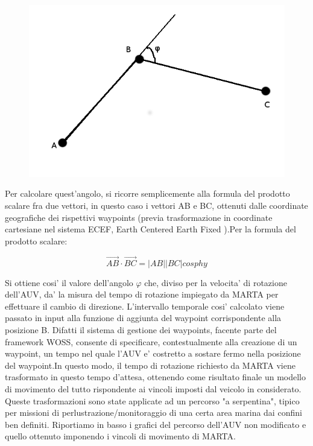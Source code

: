 \begin{figure}[H]
    \centering
	\includegraphics[scale=0.5]{scalarprod.png}
\end{figure}

Per calcolare quest'angolo, si ricorre semplicemente alla formula del prodotto scalare fra due vettori, in questo caso i vettori AB e BC, ottenuti dalle coordinate geografiche dei rispettivi waypoints (previa trasformazione in coordinate cartesiane nel sistema ECEF, Earth Centered Earth Fixed ).\newline Per la formula del prodotto scalare:


\begin{equation}
\overrightarrow{AB} \cdot \overrightarrow{BC} = |AB| |BC| cos{phy}    
\end{equation}

 
Si ottiene cosi' il valore dell'angolo $\varphi$ che, diviso per la velocita' di rotazione dell'AUV, da' la misura del tempo di rotazione impiegato da MARTA per effettuare il cambio di direzione. \newline L'intervallo temporale cosi' calcolato viene passato in input alla funzione di aggiunta del waypoint corrispondente alla posizione B.
\newline Difatti il sistema di gestione dei waypoints, facente parte del framework WOSS, consente di specificare, contestualmente alla creazione di un waypoint, un tempo nel quale l'AUV e' costretto a sostare fermo nella posizione del waypoint.\newline In questo modo, il tempo di rotazione richiesto da MARTA viene trasformato in questo tempo d'attesa, ottenendo come risultato finale un modello di movimento del tutto rispondente ai vincoli imposti dal veicolo in considerato.\newline
Queste trasformazioni sono state applicate ad un percorso "a serpentina", tipico per missioni di perlustrazione/monitoraggio di una certa area marina dai confini ben definiti.\newline
Riportiamo in basso i grafici del percorso dell'AUV non modificato e quello ottenuto imponendo i vincoli di movimento di MARTA.

